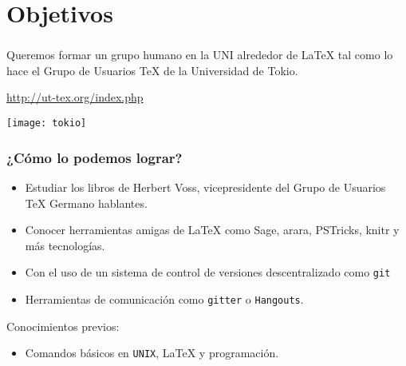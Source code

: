 \section{Objetivos}

\begin{frame}
\frametitle{\insertsection}
 	Queremos formar un grupo humano en la UNI alrededor de \LaTeX{} tal como lo hace el Grupo de Usuarios \TeX{} de la Universidad de Tokio.
 	
 	\url{http://ut-tex.org/index.php}
 	\begin{center}
 	\texttt{[image: tokio]}		
 	\end{center}
\end{frame}

\begin{frame}[fragile]
\frametitle{¿Cómo lo podemos lograr?}
\begin{itemize}
	\item Estudiar los libros de Herbert Voss, vicepresidente del Grupo de Usuarios \TeX{} Germano hablantes.
	\item Conocer herramientas amigas de \LaTeX{} como Sage, arara, PSTricks, knitr y más tecnologías. 
	\item Con el uso de un sistema de control de versiones descentralizado como \texttt{git}
	\item Herramientas de comunicación como \texttt{gitter} o \texttt{Hangouts}.
\end{itemize}
Conocimientos previos:
\begin{itemize}
	\item Comandos básicos en \texttt{UNIX}, \LaTeX{} y programación.
\end{itemize}
\end{frame}




